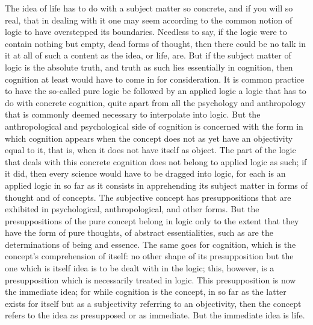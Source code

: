 The idea of life has to do with a subject matter so concrete, and if you will so
real, that in dealing with it one may seem according to the common notion
of logic to have overstepped its boundaries. Needless to say, if the logic were
to contain nothing but empty, dead forms of thought, then there could be
no talk in it at all of such a content as the idea, or life, are. But if the subject
matter of logic is the absolute truth, and truth as such lies essentially in
cognition, then cognition at least would have to come in for consideration.
It is common practice to have the so-called pure logic be followed by an
applied logic
 a logic that has to do with concrete cognition, quite apart from
all the psychology and anthropology that is commonly deemed necessary to
interpolate into logic. But the anthropological and psychological side of
cognition is concerned with the form in which cognition appears when the
concept does not as yet have an objectivity equal to it, that is, when it
does not have itself as object. The part of the logic that deals with this
concrete cognition does not belong to applied logic as such; if it did, then
every science would have to be dragged into logic, for each is an applied
logic in so far as it consists in apprehending its subject matter in forms of
thought and of concepts.
 The subjective concept has presuppositions that
are exhibited in psychological, anthropological, and other forms. But the
presuppositions of the pure concept belong in logic only to the extent that
they have the form of pure thoughts, of abstract essentialities, such as are the
determinations of being and essence. The same goes for cognition, which is
the concept's comprehension of itself: no other shape of its presupposition
but the one which is itself idea is to be dealt with in the logic; this, however,
is a presupposition which is necessarily treated in logic. This presupposition
is now the immediate idea; for while cognition is the concept, in so far as
the latter exists for itself but as a subjectivity referring to an objectivity,
then the concept refers to the idea as presupposed or as immediate. But the
immediate idea is life.

